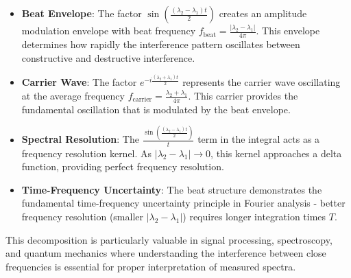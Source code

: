 \documentclass[12pt]{article}
\begin{document}
\begin{itemize}
\item \textbf{Beat Envelope}: The factor $\sin\left(\frac{(\lambda_2 - \lambda_1)t}{2}\right)$ creates an amplitude modulation envelope with beat frequency $f_{\text{beat}} = \frac{|\lambda_2 - \lambda_1|}{4\pi}$. This envelope determines how rapidly the interference pattern oscillates between constructive and destructive interference.

\item \textbf{Carrier Wave}: The factor $e^{-i\frac{(\lambda_2 + \lambda_1)t}{2}}$ represents the carrier wave oscillating at the average frequency $f_{\text{carrier}} = \frac{\lambda_2 + \lambda_1}{4\pi}$. This carrier provides the fundamental oscillation that is modulated by the beat envelope.

\item \textbf{Spectral Resolution}: The $\frac{\sin\left(\frac{(\lambda_2 - \lambda_1)t}{2}\right)}{t}$ term in the integral acts as a frequency resolution kernel. As $|\lambda_2 - \lambda_1| \to 0$, this kernel approaches a delta function, providing perfect frequency resolution.

\item \textbf{Time-Frequency Uncertainty}: The beat structure demonstrates the fundamental time-frequency uncertainty principle in Fourier analysis - better frequency resolution (smaller $|\lambda_2 - \lambda_1|$) requires longer integration times $T$.
\end{itemize}

This decomposition is particularly valuable in signal processing, spectroscopy, and quantum mechanics where understanding the interference between close frequencies is essential for proper interpretation of measured spectra.
\end{document}
